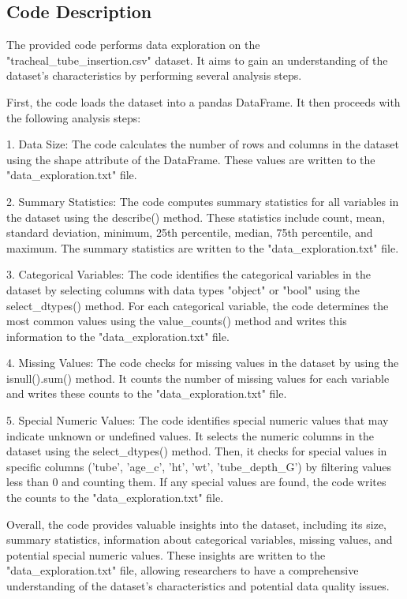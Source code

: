 \documentclass[11pt]{article}
\begin{document}
\subsection{Code Description}

The provided code performs data exploration on the "tracheal\_tube\_insertion.csv" dataset. It aims to gain an understanding of the dataset's characteristics by performing several analysis steps.

First, the code loads the dataset into a pandas DataFrame. It then proceeds with the following analysis steps:

1. Data Size:
   The code calculates the number of rows and columns in the dataset using the shape attribute of the DataFrame. These values are written to the "data\_exploration.txt" file.

2. Summary Statistics:
   The code computes summary statistics for all variables in the dataset using the describe() method. These statistics include count, mean, standard deviation, minimum, 25th percentile, median, 75th percentile, and maximum. The summary statistics are written to the "data\_exploration.txt" file.

3. Categorical Variables:
   The code identifies the categorical variables in the dataset by selecting columns with data types "object" or "bool" using the select\_dtypes() method. For each categorical variable, the code determines the most common values using the value\_counts() method and writes this information to the "data\_exploration.txt" file.

4. Missing Values:
   The code checks for missing values in the dataset by using the isnull().sum() method. It counts the number of missing values for each variable and writes these counts to the "data\_exploration.txt" file.

5. Special Numeric Values:
   The code identifies special numeric values that may indicate unknown or undefined values. It selects the numeric columns in the dataset using the select\_dtypes() method. Then, it checks for special values in specific columns ('tube', 'age\_c', 'ht', 'wt', 'tube\_depth\_G') by filtering values less than 0 and counting them. If any special values are found, the code writes the counts to the "data\_exploration.txt" file.

Overall, the code provides valuable insights into the dataset, including its size, summary statistics, information about categorical variables, missing values, and potential special numeric values. These insights are written to the "data\_exploration.txt" file, allowing researchers to have a comprehensive understanding of the dataset's characteristics and potential data quality issues.
\end{document}
